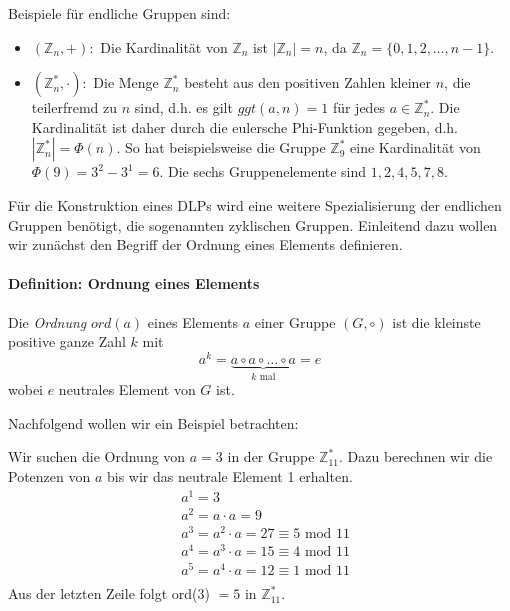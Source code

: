 Beispiele für endliche Gruppen sind:
\begin{itemize}
\item $(\mathbb{Z}_n, +):$ Die Kardinalität von $\mathbb{Z}_n$ ist $|\mathbb{Z}_n| = n$, da $\mathbb{Z}_n = \{0,1,2,\dots ,n-1\}$.
\item $(\mathbb{Z}^*_n, \cdot):$ Die Menge $\mathbb{Z}^*_n$ besteht aus den positiven Zahlen kleiner $n$, die teilerfremd zu $n$ sind, d.h. es gilt $ggt(a,n) = 1$ für jedes $a \in \mathbb{Z}^*_n$. Die Kardinalität ist daher durch die eulersche Phi-Funktion gegeben, d.h. $|\mathbb{Z}^*_n| = \Phi(n)$. So hat beispielsweise die Gruppe $\mathbb{Z}^*_9$ eine Kardinalität von $\Phi(9) = 3^2 - 3^1 = 6$. Die sechs Gruppenelemente sind ${1,2,4,5,7,8}$.
\end{itemize}

Für die Konstruktion eines DLPs wird eine weitere Spezialisierung der endlichen Gruppen benötigt, die sogenannten zyklischen Gruppen. Einleitend dazu wollen wir zunächst den Begriff der Ordnung eines Elements definieren.

\paragraph{Definition: Ordnung eines Elements}
Die \textit{Ordnung}  $ord(a)$ eines Elements $a$ einer Gruppe $(G, \circ)$ ist die kleinste positive ganze Zahl $k$ mit $$a^k = \underbrace{a \circ a \circ \dots \circ a}_{\text{$k$ mal}} = e$$ wobei $e$ neutrales Element von $G$ ist.

Nachfolgend wollen wir ein Beispiel betrachten:

Wir suchen die Ordnung von $a=3$ in der Gruppe $\mathbb{Z}^*_{11}$. Dazu berechnen wir die Potenzen von $a$ bis wir das neutrale Element 1 erhalten.
\begin{align*}
&a^1 = 3 \\
&a^2 = a \cdot a = 9\\
&a^3 = a^2 \cdot a =  27 \equiv 5 \text{ mod } 11\\
&a^4 = a^3 \cdot a =  15 \equiv 4 \text{ mod } 11\\
&a^5 = a^4 \cdot a =  12 \equiv 1 \text{ mod } 11\\
\end{align*}
Aus der letzten Zeile folgt ord(3) $= 5$ in $\mathbb{Z}^*_{11}$.

